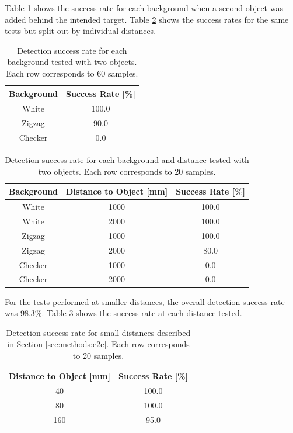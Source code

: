 Table \ref{tab:success-rates-multi} shows the success rate for each background when a second object was added behind the intended target.
Table \ref{tab:success-rates-dist-multi} shows the success rates for the same tests but split out by individual distances.

\begin{table}[H]
    \centering
    \caption{Detection success rate for each background tested with two objects. Each row corresponds to 60 samples.}
    \label{tab:success-rates-multi}
    \begin{tabular}{|c||c|}
        \hline
        Background & Success Rate [\%] \\
        \hline
        White & 100.0  \\
        Zigzag & 90.0 \\
        Checker & 0.0 \\
        \hline
    \end{tabular}
\end{table}

\begin{table}[H]
    \centering
    \caption{Detection success rate for each background and distance tested with two objects. Each row corresponds to 20 samples.}
    \label{tab:success-rates-dist-multi}
    \begin{tabular}{|c|c||c|}
        \hline
        Background & Distance to Object [mm] & Success Rate [\%] \\
        \hline
        White & 1000 & 100.0 \\
        White & 2000 & 100.0 \\
        Zigzag & 1000 & 100.0 \\
        Zigzag & 2000 & 80.0 \\
        Checker & 1000 & 0.0 \\
        Checker & 2000 & 0.0 \\
        \hline
    \end{tabular}
\end{table}


For the tests performed at smaller distances, the overall detection success rate was 
98.3\%. Table \ref{tab:success-rates-near-dist} shows the success rate at each distance
tested.

\begin{table}[H]
    \centering
    \caption{Detection success rate for small distances described in Section \ref{sec:methods:e2e}. Each row corresponds to 20 samples.}
    \label{tab:success-rates-near-dist}
    \begin{tabular}{|c||c|}
        \hline
        Distance to Object [mm] & Success Rate [\%] \\
        \hline
        40 & 100.0 \\
        80 & 100.0 \\
        160 & 95.0 \\
        \hline
    \end{tabular}
\end{table}


